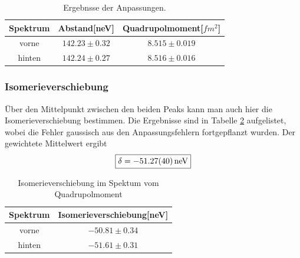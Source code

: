 \documentclass[12pt,a4paper]{article}
\begin{document}
\begin{table}
\centering
\begin{tabular}{|c|c|c|}
\hline
Spektrum & Abstand[neV] & Quadrupolmoment[$\si{fm^2}$]\\
\hline
vorne & $ 142.23 \pm 0.32 $ & $ 8.515 \pm 0.019 $\\
\hline
\hline
hinten & $ 142.24 \pm 0.27 $ & $ 8.516 \pm 0.016 $\\
\hline
\end{tabular}
\caption{Ergebnsse der Anpassungen.}
\label{tab:Quad_ergebnis}
\end{table}

\subsubsection{Isomerieverschiebung}
Über den Mittelpunkt zwischen den beiden Peaks kann man auch hier die Isomerieverschiebung bestimmen. Die Ergebnisse sind in Tabelle \ref{tab:Quad_Iso} aufgelistet, wobei die Fehler gaussisch aus den Anpassungsfehlern fortgepflanzt wurden. Der gewichtete Mittelwert ergibt
\begin{equation*}
\boxed{\delta = \SI{-51.27\pm 0.40}{neV}}
\end{equation*}

\begin{table}
\centering
\begin{tabular}{|c|c|}
\hline
Spektrum & Isomerieverschiebung[neV]\\
\hline
vorne & $ -50.81\pm 0.34 $\\
\hline
\hline
hinten & $ -51.61 \pm 0.31 $\\
\hline
\end{tabular}
\caption{Isomerieverschiebung im Spektum vom Quadrupolmoment}
\label{tab:Quad_Iso}
\end{table}
\newpage
\end{document}
